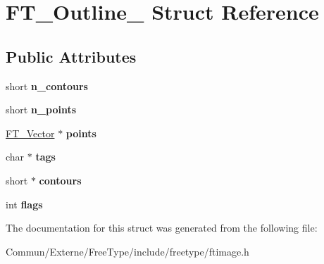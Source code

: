 \hypertarget{struct_f_t___outline__}{}\section{F\+T\+\_\+\+Outline\+\_\+ Struct Reference}
\label{struct_f_t___outline__}
\subsection*{Public Attributes}
\begin{DoxyCompactItemize}
\item 
short {\bfseries n\+\_\+contours}\hypertarget{struct_f_t___outline___a0313ba9c2c51f10e6b7d7ef97bd946e2}{}\label{struct_f_t___outline___a0313ba9c2c51f10e6b7d7ef97bd946e2}

\item 
short {\bfseries n\+\_\+points}\hypertarget{struct_f_t___outline___a7ebcf3c33231af88655534d1ac02b66e}{}\label{struct_f_t___outline___a7ebcf3c33231af88655534d1ac02b66e}

\item 
\hyperlink{struct_f_t___vector__}{F\+T\+\_\+\+Vector} $\ast$ {\bfseries points}\hypertarget{struct_f_t___outline___a4871896a2f38bdab947e30a7cf6bca04}{}\label{struct_f_t___outline___a4871896a2f38bdab947e30a7cf6bca04}

\item 
char $\ast$ {\bfseries tags}\hypertarget{struct_f_t___outline___ac84ca66907361e1f49ec11c14720087a}{}\label{struct_f_t___outline___ac84ca66907361e1f49ec11c14720087a}

\item 
short $\ast$ {\bfseries contours}\hypertarget{struct_f_t___outline___a218fdea14003061142ac1045ac50affa}{}\label{struct_f_t___outline___a218fdea14003061142ac1045ac50affa}

\item 
int {\bfseries flags}\hypertarget{struct_f_t___outline___a149765f0be0eab4fc82410cf853964bf}{}\label{struct_f_t___outline___a149765f0be0eab4fc82410cf853964bf}

\end{DoxyCompactItemize}


The documentation for this struct was generated from the following file\+:\begin{DoxyCompactItemize}
\item 
Commun/\+Externe/\+Free\+Type/include/freetype/ftimage.\+h\end{DoxyCompactItemize}
